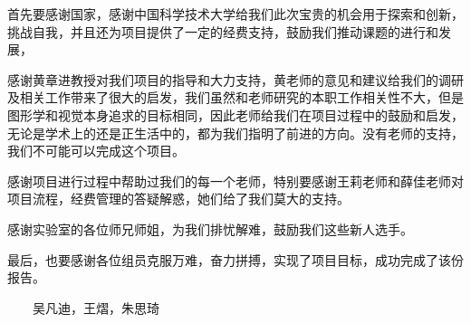 
\begin{thanks}

首先要感谢国家，感谢中国科学技术大学给我们此次宝贵的机会用于探索和创新，挑战自我，并且还为项目提供了一定的经费支持，鼓励我们推动课题的进行和发展，

感谢黄章进教授对我们项目的指导和大力支持，黄老师的意见和建议给我们的调研及相关工作带来了很大的启发，我们虽然和老师研究的本职工作相关性不大，但是图形学和视觉本身追求的目标相同，因此老师给我们在项目过程中的鼓励和启发，无论是学术上的还是正生活中的，都为我们指明了前进的方向。没有老师的支持，我们不可能可以完成这个项目。

感谢项目进行过程中帮助过我们的每一个老师，特别要感谢王莉老师和薛佳老师对项目流程，经费管理的答疑解惑，她们给了我们莫大的支持。

感谢实验室的各位师兄师姐，为我们排忧解难，鼓励我们这些新人选手。

最后，也要感谢各位组员克服万难，奋力拼搏，实现了项目目标，成功完成了该份报告。

\begin{flushright}

~~~~吴凡迪，王熠，朱思琦~~~~

\date{2017年5月10日}

\end{flushright}

\end{thanks}

